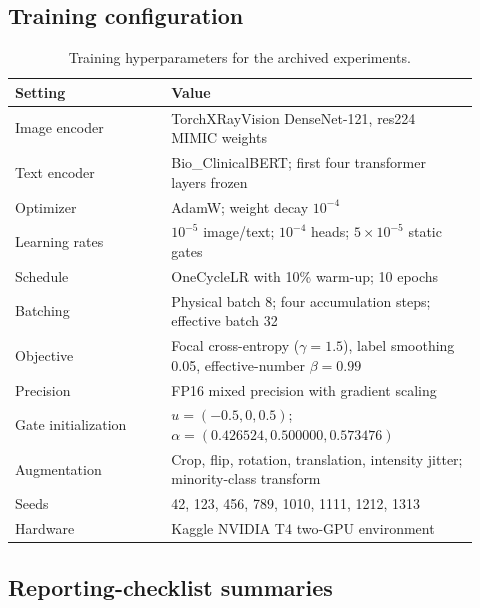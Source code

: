 \documentclass[a4paper,fleqn]{cas-sc}
\begin{document}
\subsection{Training configuration}

\begin{table}[pos=H]
\centering
\caption{Training hyperparameters for the archived experiments.}
\label{tab:s-hyperparameters}
\scriptsize
\begin{tabular}{p{0.31\linewidth}p{0.61\linewidth}}
\toprule
Setting & Value \\
\midrule
Image encoder & TorchXRayVision DenseNet-121, res224 MIMIC weights \\
Text encoder & Bio\_ClinicalBERT; first four transformer layers frozen \\
Optimizer & AdamW; weight decay $10^{-4}$ \\
Learning rates & $10^{-5}$ image/text; $10^{-4}$ heads; $5\times10^{-5}$ static gates \\
Schedule & OneCycleLR with 10\% warm-up; 10 epochs \\
Batching & Physical batch 8; four accumulation steps; effective batch 32 \\
Objective & Focal cross-entropy ($\gamma=1.5$), label smoothing 0.05, effective-number $\beta=0.99$ \\
Precision & FP16 mixed precision with gradient scaling \\
Gate initialization & $u=(-0.5,0,0.5)$; $\alpha=(0.426524,0.500000,0.573476)$ \\
Augmentation & Crop, flip, rotation, translation, intensity jitter; minority-class transform \\
Seeds & 42, 123, 456, 789, 1010, 1111, 1212, 1313 \\
Hardware & Kaggle NVIDIA T4 two-GPU environment \\
\bottomrule
\end{tabular}
\end{table}

\subsection{Reporting-checklist summaries}
\end{document}

